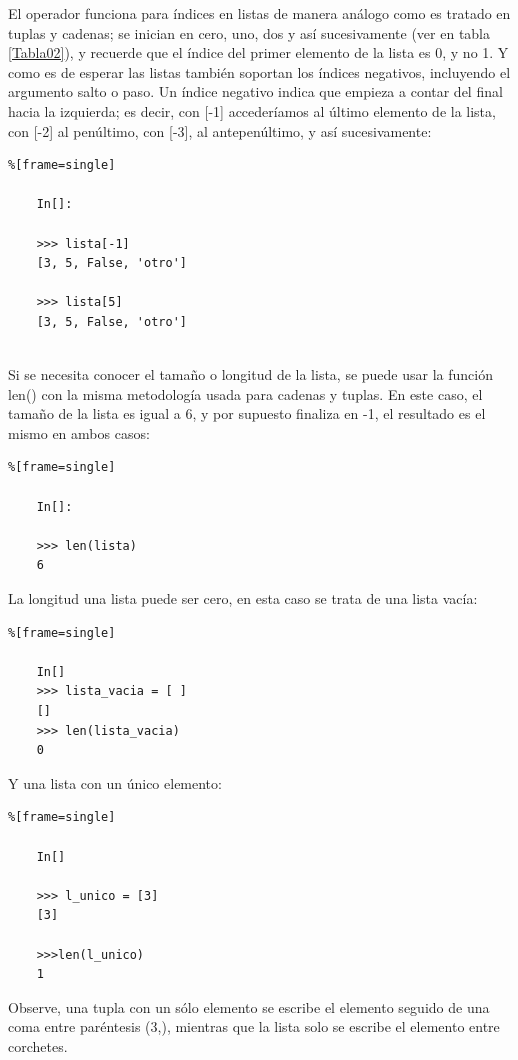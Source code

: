 El  operador {\ttfamily []} funciona para índices en listas  de manera análogo como es tratado en tuplas y cadenas;  se inician en cero, uno, dos y así sucesivamente (ver en tabla \ref{Tabla02}), y recuerde que  el índice del primer elemento de la lista es 0, y no 1.  Y como es de esperar las listas también   soportan los índices negativos, incluyendo el argumento salto o paso. Un  índice negativo indica  que empieza a contar del final hacia la izquierda; es decir, con [-1] accederíamos al último elemento de la lista, con [-2] al penúltimo, con [-3], al antepenúltimo, y así sucesivamente:

\begin{lstlisting}%[frame=single]
	
	In[]:
	
	>>> lista[-1]
	[3, 5, False, 'otro']
	
	>>> lista[5]
	[3, 5, False, 'otro']
	
\end{lstlisting}

Si se necesita conocer el tamaño o longitud de la lista, se puede usar la función {\ttfamily len()}  con la misma metodología usada para cadenas y tuplas. En este caso, el tamaño de la lista es igual a 6, y por supuesto finaliza en -1, el resultado es el mismo en ambos casos:

\begin{lstlisting}%[frame=single]
	
	In[]:
	
	>>> len(lista)
	6
\end{lstlisting}


\noindent La longitud una lista puede ser cero, en esta caso se trata de una lista vacía: 

\begin{lstlisting}%[frame=single]
	
	In[]
	>>> lista_vacia = [ ]
	[]
	>>> len(lista_vacia)
	0
\end{lstlisting}

\noindent Y una lista con un único elemento:  

\begin{lstlisting}%[frame=single]
	
	In[]
	
	>>> l_unico = [3] 
	[3]
	
	>>>len(l_unico) 
	1
\end{lstlisting}

Observe, una tupla con un sólo elemento se escribe el elemento seguido de una coma entre paréntesis {\ttfamily (3,)}, mientras que la lista solo se escribe el elemento entre corchetes.


